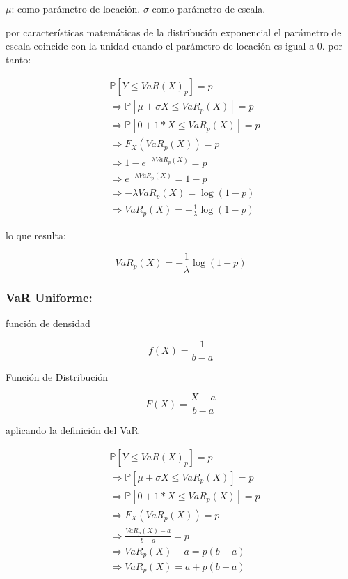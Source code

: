 \documentclass[10pt,]{article}
\begin{document}
\(\mu\): como parámetro de locación. \(\sigma\) como parámetro de
escala.

por características matemáticas de la distribución exponencial el
parámetro de escala coincide con la unidad cuando el parámetro de
locación es igual a 0. por tanto:

\[\begin{array}{rl}  
&\displaystyle \mathbb{P}[Y \leq VaR(X)_p]=p\\
&\displaystyle \Rightarrow \mathbb{P}[\mu + \sigma X \leq VaR_p(X)] = p\\
&\displaystyle \Rightarrow \mathbb{P}[0 + 1* X \leq VaR_p(X)] = p\\
&\displaystyle \Rightarrow F_X(VaR_{p}(X)) = p\\
&\displaystyle \Rightarrow 1- e^{-\lambda VaR_{p}(X)}=p\\
&\displaystyle \Rightarrow e^{-\lambda VaR_{p}(X)}= 1-p\\
&\displaystyle \Rightarrow -\lambda VaR_{p}(X)= \log(1-p)\\
&\displaystyle \Rightarrow VaR_{p}(X)= -\frac{1}{\lambda}\log(1-p)
\end{array}\]

lo que resulta:

\[VaR_{p}(X)= -\frac{1}{\lambda}\log(1-p)\]

\hypertarget{var-uniforme}{%
\subsubsection{\texorpdfstring{\textbf{VaR
Uniforme:}}{VaR Uniforme:}}\label{var-uniforme}}

función de densidad

\[f(X)= \frac{1}{b-a}\]

Función de Distribución

\[F(X)= \frac{X-a}{b-a}\]

aplicando la definición del VaR

\[\begin{array}{rl}  
&\displaystyle \mathbb{P}[Y \leq VaR(X)_p]=p\\
&\displaystyle \Rightarrow \mathbb{P}[\mu + \sigma X \leq VaR_p(X)] = p\\
&\displaystyle \Rightarrow \mathbb{P}[0 + 1* X \leq VaR_p(X)] = p\\
&\displaystyle \Rightarrow F_X(VaR_{p}(X)) = p\\
&\displaystyle \Rightarrow \frac{VaR_{p}(X)-a}{b-a}=p\\
&\displaystyle \Rightarrow VaR_{p}(X)-a=p(b-a)\\
&\displaystyle \Rightarrow VaR_{p}(X)=a+p(b-a)
\end{array}\]
\end{document}
